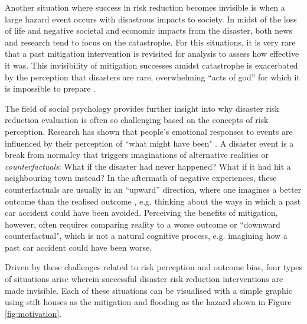     Another situation where success in risk reduction becomes invisible is when a large hazard event occurs with disastrous impacts to society. In midst of the loss of life and negative societal and economic impacts from the disaster, both news and research tend to focus on the catastrophe. For this situations, it is very rare that a past mitigation intervention is revisited for analysis to assess how effective it was. This invisibility of mitigation successes amidst catastrophe is exacerbated by the perception that disasters are rare, overwhelming “acts of god” for which it is impossible to prepare \citep{gaillard_disaster_2019}. 

    The field of social psychology provides further insight into why disaster risk reduction evaluation is often so challenging based on the concepts of risk perception. Research has shown that people’s emotional responses to events are influenced by their perception of ``what might have been" \citep{medvec_when_1995,roese_what_2014}. A disaster event is a break from normalcy that triggers imaginations of alternative realities or \textit{counterfactuals}: What if the disaster had never happened? What if it had hit a neighbouring town instead? In the aftermath of negative experiences, these counterfactuals are usually in an “upward” direction, where one imagines a better outcome than the realised outcome \citep{blix_thinking_2016}, e.g. thinking about the ways in which a past car accident could have been avoided. Perceiving the benefits of mitigation, however, often requires comparing reality to a worse outcome or ``downward counterfactual", which is not a natural cognitive process, e.g. imagining how a past car accident could have been worse. 
   
    Driven by these challenges related to risk perception and outcome bias, four types of situations arise wherein successful disaster risk reduction interventions are made invisible. Each of these situations can be visualised with a simple graphic using stilt houses as the mitigation and flooding as the hazard shown in Figure \ref{fig:motivation}.
    
